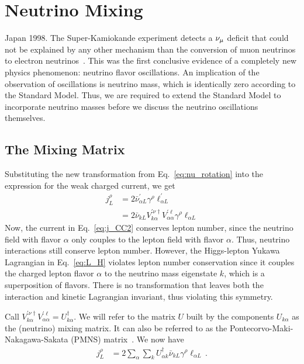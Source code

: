 \section{Neutrino Mixing}\label{ch:oscillation}
Japan 1998. The Super-Kamiokande experiment detects a $\nu_\mu$ deficit that could not be explained by any other mechanism
than the conversion of muon neutrinos to electron neutrinos~\cite{sk1998}. This was the first conclusive evidence of a completely new physics phenomenon: neutrino flavor
oscillations. An implication of the observation of oscillations is neutrino mass, 
which is identically zero according to the Standard Model. Thus, we are required to extend the Standard Model to incorporate neutrino 
masses before we discuss the neutrino oscillations themselves.

\subsection{The Mixing Matrix}
Substituting the new transformation from Eq.~\ref{eq:nu_rotation} into the expression for the weak charged current, we get
\begin{align}\label{eq:j_CC2}
    j^\rho_L &= 2\bar{\nu}^\prime_{\alpha L} \gamma^\rho \ell_{\alpha L}^\prime \nonumber \\
             &= 2\bar{\nu}_{k L} V^{\prime \nu \dagger}_{k \alpha}V^{\prime \ell}_{\alpha \alpha} \gamma^\rho  \ell_{\alpha L}
\end{align}
Now, the current in Eq.~\ref{eq:j_CC2} conserves lepton number, since the neutrino field with flavor $\alpha$ only couples to the lepton field with flavor $\alpha$. 
Thus, neutrino interactions still conserve lepton number.
However, the Higgs-lepton Yukawa Lagrangian 
in Eq.~\ref{eq:L_H} violates lepton number conservation since it couples the charged lepton flavor $\alpha$ to the neutrino mass eigenstate $k$, which is a superposition of flavors. 
There is no transformation that leaves both the interaction and kinetic Lagrangian invariant, thus violating this symmetry.


Call $V^{\prime \nu \dagger}_{k \alpha}V^{\prime \ell}_{\alpha \alpha} = U^\dagger_{k \alpha}$. We will refer to the matrix $U$ built by the components $U_{k \alpha}$ as the (neutrino) mixing matrix. It can also be referred to as the 
Pontecorvo-Maki-Nakagawa-Sakata (PMNS) matrix~\cite{pontecorvo1957,maki1962}.
We now have 
\begin{align}\label{eq:j_CC3}
    j^\rho_L &= 2 \sum_\alpha \sum_k U^\dagger_{\alpha k} \bar{\nu}_{k L} \gamma^\rho  \ell_{\alpha L}\,.
\end{align}


